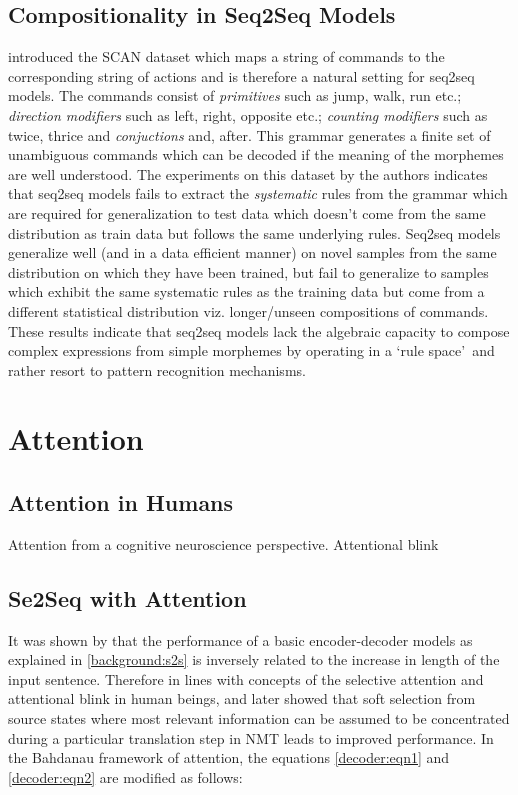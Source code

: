 \subsection{Compositionality in Seq2Seq Models}
\cite{Lake2017} introduced the SCAN dataset which maps a string of commands to the corresponding string of actions and is therefore a natural setting for seq2seq models. The commands consist of \textit{primitives} such as jump, walk, run etc.; \textit{direction modifiers} such as left, right, opposite etc.; \textit{counting modifiers} such as twice, thrice and \textit{conjuctions} and, after. This grammar generates a finite set of unambiguous commands which can be decoded if the meaning of the morphemes are well understood. The experiments on this dataset by the authors indicates that seq2seq models fails to extract the \textit{systematic} rules from the grammar which are required for generalization to test data which doesn't come from the same distribution as train data but follows the same underlying rules. Seq2seq models generalize well (and in a data efficient manner) on novel samples from the same distribution on which they have been trained, but fail to generalize to samples which exhibit the same systematic rules as the training data but come from a different statistical distribution viz. longer/unseen compositions of commands. These results indicate that seq2seq models lack the algebraic capacity to compose complex expressions from simple morphemes by operating in a \lq rule space{}\rq\ and rather resort to pattern recognition mechanisms.


\section{Attention}

\subsection{Attention in Humans}
Attention from a cognitive neuroscience perspective. Attentional blink

\subsection{Se2Seq with Attention}\label{mtv:attn}
It was shown by \cite{Cho2014} that the performance of a basic encoder-decoder models as explained in \ref{background:s2s} is inversely related to the increase in length of the input sentence. Therefore in lines with concepts of the selective attention and attentional blink in human beings, \cite{Bahdanau2014} and later  \cite{Luong2015} showed that soft selection from source states where most relevant information can be assumed to be concentrated during a particular translation step in NMT leads to improved performance. In the Bahdanau \citep{Bahdanau2014} framework of attention, the equations \ref{decoder:eqn1} and \ref{decoder:eqn2} are modified as follows:

